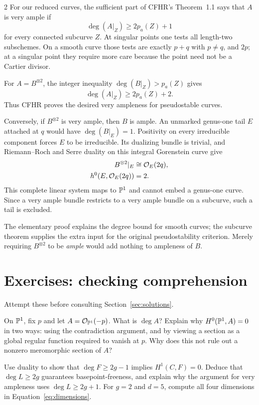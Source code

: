 \documentclass[12pt]{memoir}
\begin{document}
\begin{multicols}{2}
For our reduced curves, the sufficient part of CFHR's Theorem~1.1
\cite{CFHR} says that $A$ is very ample if
\[
 \deg(A|_Z)\ge2p_a(Z)+1
\]
for every connected subcurve $Z$. At singular points one tests all
length-two subschemes. On a smooth curve those tests are exactly
$p+q$ with $p\ne q$, and $2p$; at a singular point they require
more care because the point need not be a Cartier divisor.

For $A=B^{\otimes2}$, the integer inequality $\deg(B|_Z)>p_a(Z)$ gives
\[
 \deg(A|_Z)\ge2p_a(Z)+2.
\]
Thus CFHR proves the desired very ampleness for pseudostable curves.

Conversely, if $B^{\otimes2}$ is very ample, then $B$ is ample.
An unmarked genus-one tail $E$ attached at $q$ would have
$\deg(B|_E)=1$. Positivity on every irreducible component forces
$E$ to be irreducible. Its dualizing bundle is trivial, and
Riemann--Roch and Serre duality on this integral Gorenstein curve give
\[
\begin{aligned}
 B^{\otimes2}|_E&\cong\mathcal{O}_E(2q),\\
 h^0(E,\mathcal{O}_E(2q))&=2.
\end{aligned}
\]
This complete linear system maps to $\mathbb{P}^1$ and cannot embed a
genus-one curve. Since a very ample bundle restricts to a very ample
bundle on a subcurve, such a tail is excluded.

The elementary proof explains the degree bound for smooth curves;
the subcurve theorem supplies the extra input for the original
pseudostability criterion. Merely requiring $B^{\otimes2}$ to be
\emph{ample} would add nothing to ampleness of $B$.

\section{Exercises: checking comprehension}\label{sec:exercises}

Attempt these before consulting Section~\ref{sec:solutions}.

\begin{Ej}\label{ex:negative}
On $\mathbb{P}^1$, fix $p$ and let $A=\mathcal{O}_{\mathbb{P}^1}(-p)$.
What is $\deg A$? Explain why $H^0(\mathbb{P}^1,A)=0$ in two ways:
using the contradiction argument, and by viewing a section as a
global regular function required to vanish at $p$.
Why does this not rule out a nonzero meromorphic section of $A$?
\end{Ej}

\begin{Ej}\label{ex:thresholds}
Use duality to show that $\deg F\ge2g-1$ implies $H^1(C,F)=0$.
Deduce that $\deg L\ge2g$ guarantees basepoint-freeness, and explain
why the argument for very ampleness uses $\deg L\ge2g+1$.
For $g=2$ and $d=5$, compute all four dimensions in
Equation~\eqref{eq:dimensions}.
\end{Ej}


\end{multicols}
\end{document}
